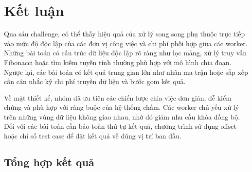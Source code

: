 \section{Kết luận}
\label{sec:conclusion}

Qua sáu challenge, có thể thấy hiệu quả của xử lý song song phụ thuộc trực tiếp vào mức độ độc lập của các đơn vị công việc và chi phí phối hợp giữa các worker. Những bài toán có cấu trúc dữ liệu độc lập rõ ràng như lọc mảng, xử lý truy vấn Fibonacci hoặc tìm kiếm tuyến tính thường phù hợp với mô hình chia đoạn. Ngược lại, các bài toán có kết quả trung gian lớn như nhân ma trận hoặc sắp xếp cần cân nhắc kỹ chi phí truyền dữ liệu và bước gom kết quả.

Về mặt thiết kế, nhóm đã ưu tiên các chiến lược chia việc đơn giản, dễ kiểm chứng và phù hợp với ràng buộc của hệ thống chấm. Các worker chủ yếu xử lý trên những vùng dữ liệu không giao nhau, nhờ đó giảm nhu cầu khóa đồng bộ. Đối với các bài toán cần bảo toàn thứ tự kết quả, chương trình sử dụng offset hoặc chỉ số test case để đặt kết quả về đúng vị trí ban đầu.

\subsection{Tổng hợp kết quả}
\begin{table}[H]
\centering
\caption{Tổng hợp speedup tốt nhất sau khi đo}
\end{table}

